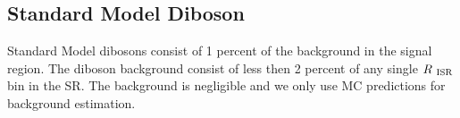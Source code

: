 \subsection{Standard Model Diboson}
\label{sec:Bkg:diboson}

Standard Model dibosons consist of 1 percent of the background in the signal region.  The diboson background consist of less then 2 percent of any single $R_{~\mathrm{ISR}}$ bin in the SR.  The background is negligible and we only use MC predictions for background estimation.